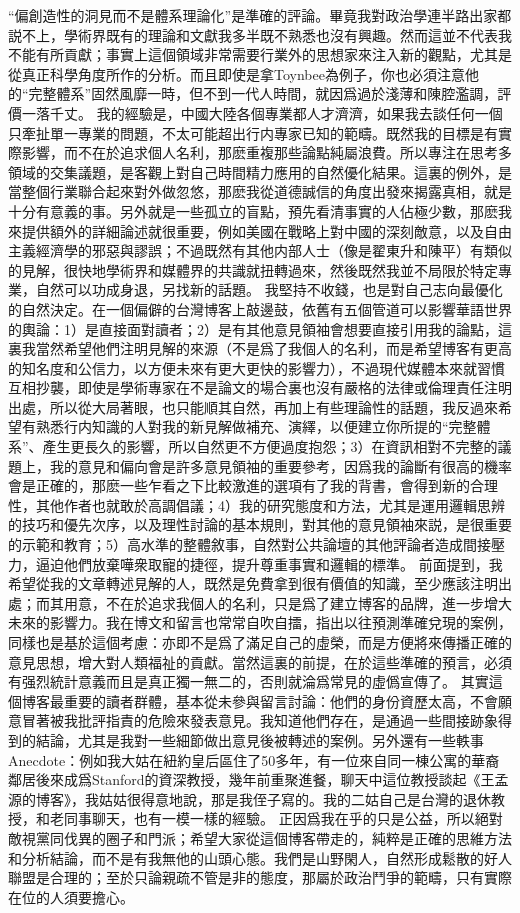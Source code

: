 \documentclass[twocolumn]{ctexart}
\begin{document}
“偏創造性的洞見而不是體系理論化”是準確的評論。畢竟我對政治學連半路出家都説不上，學術界既有的理論和文獻我多半既不熟悉也沒有興趣。然而這並不代表我不能有所貢獻；事實上這個領域非常需要行業外的思想家來注入新的觀點，尤其是從真正科學角度所作的分析。而且即使是拿Toynbee為例子，你也必須注意他的“完整體系”固然風靡一時，但不到一代人時間，就因爲過於淺薄和陳腔濫調，評價一落千丈。
我的經驗是，中國大陸各個專業都人才濟濟，如果我去談任何一個只牽扯單一專業的問題，不太可能超出行内專家已知的範疇。既然我的目標是有實際影響，而不在於追求個人名利，那麽重複那些論點純屬浪費。所以專注在思考多領域的交集議題，是客觀上對自己時間精力應用的自然優化結果。這裏的例外，是當整個行業聯合起來對外做忽悠，那麽我從道德誠信的角度出發來揭露真相，就是十分有意義的事。另外就是一些孤立的盲點，預先看清事實的人佔極少數，那麽我來提供額外的詳細論述就很重要，例如美國在戰略上對中國的深刻敵意，以及自由主義經濟學的邪惡與謬誤；不過既然有其他内部人士（像是翟東升和陳平）有類似的見解，很快地學術界和媒體界的共識就扭轉過來，然後既然我並不局限於特定專業，自然可以功成身退，另找新的話題。
我堅持不收錢，也是對自己志向最優化的自然決定。在一個偏僻的台灣博客上敲邊鼓，依舊有五個管道可以影響華語世界的輿論：1）是直接面對讀者；2）是有其他意見領袖會想要直接引用我的論點，這裏我當然希望他們注明見解的來源（不是爲了我個人的名利，而是希望博客有更高的知名度和公信力，以方便未來有更大更快的影響力），不過現代媒體本來就習慣互相抄襲，即使是學術專家在不是論文的場合裏也沒有嚴格的法律或倫理責任注明出處，所以從大局著眼，也只能順其自然，再加上有些理論性的話題，我反過來希望有熟悉行内知識的人對我的新見解做補充、演繹，以便建立你所提的“完整體系”、產生更長久的影響，所以自然更不方便過度抱怨；3）在資訊相對不完整的議題上，我的意見和偏向會是許多意見領袖的重要參考，因爲我的論斷有很高的機率會是正確的，那麽一些乍看之下比較激進的選項有了我的背書，會得到新的合理性，其他作者也就敢於高調倡議；4）我的研究態度和方法，尤其是運用邏輯思辨的技巧和優先次序，以及理性討論的基本規則，對其他的意見領袖來説，是很重要的示範和教育；5）高水準的整體敘事，自然對公共論壇的其他評論者造成間接壓力，逼迫他們放棄嘩衆取寵的捷徑，提升尊重事實和邏輯的標準。
前面提到，我希望從我的文章轉述見解的人，既然是免費拿到很有價值的知識，至少應該注明出處；而其用意，不在於追求我個人的名利，只是爲了建立博客的品牌，進一步增大未來的影響力。我在博文和留言也常常自吹自擂，指出以往預測準確兌現的案例，同樣也是基於這個考慮：亦即不是爲了滿足自己的虛榮，而是方便將來傳播正確的意見思想，增大對人類福祉的貢獻。當然這裏的前提，在於這些準確的預言，必須有强烈統計意義而且是真正獨一無二的，否則就淪爲常見的虛僞宣傳了。
其實這個博客最重要的讀者群體，基本從未參與留言討論：他們的身份資歷太高，不會願意冒著被我批評指責的危險來發表意見。我知道他們存在，是通過一些間接跡象得到的結論，尤其是我對一些細節做出意見後被轉述的案例。另外還有一些軼事Anecdote：例如我大姑在紐約皇后區住了50多年，有一位來自同一棟公寓的華裔鄰居後來成爲Stanford的資深教授，幾年前重聚進餐，聊天中這位教授談起《王孟源的博客》，我姑姑很得意地說，那是我侄子寫的。我的二姑自己是台灣的退休教授，和老同事聊天，也有一模一樣的經驗。
正因爲我在乎的只是公益，所以絕對敵視黨同伐異的圈子和門派；希望大家從這個博客帶走的，純粹是正確的思維方法和分析結論，而不是有我無他的山頭心態。我們是山野閑人，自然形成鬆散的好人聯盟是合理的；至於只論親疏不管是非的態度，那屬於政治鬥爭的範疇，只有實際在位的人須要擔心。
\end{document}
